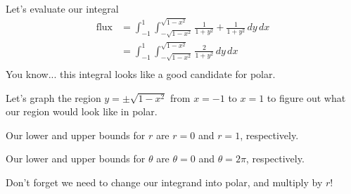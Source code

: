 \documentclass{article}
\begin{document}
Let's evaluate our integral
\begin{align*}
    \text{flux}&=\int_{-1}^1\int_{-\sqrt{1-x^2}}^{\sqrt{1-x^2}}\frac{1}{1+y^2}+\frac{1}{1+y^2}\,dy\,dx\\
    &=\int_{-1}^1\int_{-\sqrt{1-x^2}}^{\sqrt{1-x^2}}\frac{2}{1+y^2}\,dy\,dx\\
\end{align*}
You know... this integral looks like a good candidate for polar. 

Let's graph the region $y=\pm\sqrt{1-x^2}$ from $x=-1$ to $x=1$ to figure out what our region would look like in polar.
\begin{center}
\end{center}
Our lower and upper bounds for $r$ are $r=0$ and $r=1$, respectively.

Our lower and upper bounds for $\theta$ are $\theta=0$ and $\theta=2\pi$, respectively.

Don't forget we need to change our integrand into polar, and multiply by $r$!
\end{document}
